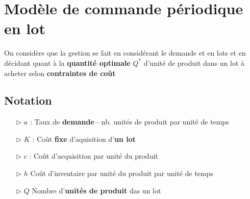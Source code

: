 \documentclass{report}
\begin{document}
\begin{multicols*}{2}
\begin{center}
    \end{center}

    \section{Modèle de commande périodique en lot}
    On considère que la gestion se fait en considérant 
    le demande et en lots et en décidant quant à 
    la \textbf{quantité optimale}  \( Q^{*} \) 
    d'unité de produit dans un lot à acheter selon \textbf{contraintes de coût}  

    \subsection{Notation}
    \begin{itemize}
        \item [$\rhd$ ] \( a \) : Taux de \textbf{demande}---nb.
            unités de produit par unité de temps  
        \item [$\rhd$ ] \( K \) : Coût \textbf{fixe} d'aquisition d'\textbf{un lot}    
        \item [$\rhd$ ] \( c \) : Coût d'acquisition par unité du produit 
        \item [$\rhd$ ] \( h \) Coût d'inventaire par unité du produit par unité de temps 
        \item [$\rhd$ ] \( Q \) Nombre d'\textbf{unités de produit} das un lot  
    \end{itemize}   


    \begin{tikzpicture}[scale=1.5, >=stealth]


\end{tikzpicture}
\end{multicols*}
\end{document}
